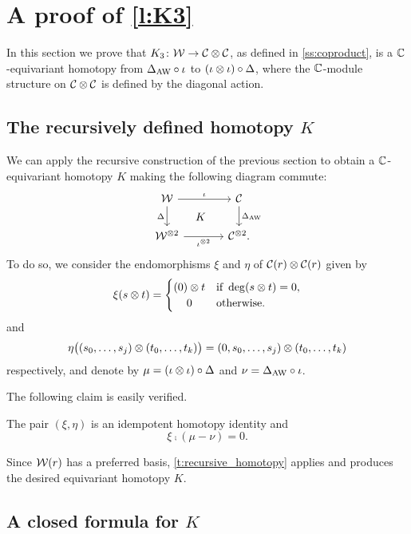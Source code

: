 
\section{A proof of \cref{l:K3}}\label{s:postponed}

In this section we prove that $K_3 \colon \mathcal{W} \to \mathcal{C} \otimes \mathcal{C}$, as defined in \cref{ss:coproduct}, is a $\mathbb{C}$-equivariant homotopy from $\Delta_{\operatorname{AW}} \mathbin{\circ} \iota$ to $(\iota \otimes \iota) \mathbin{\circ} \Delta$, where the $\mathbb{C}$-module structure on $\mathcal{C} \otimes \mathcal{C}$ is defined by the diagonal action.

\subsection{The recursively defined homotopy $K$}

We can apply the recursive construction of the previous section to obtain a $\mathbb{C}$-equivariant homotopy $K$ making the following diagram commute:
\begin{equation*}
	\begin{tikzcd}[column sep=large]
		\cW \arrow[r,"\iota"] \arrow[d,"\Delta"'] \arrow[dr,phantom,"K"]&
		\cC \arrow[d,"\Delta_{\AW}"] \\
		\cW^{\ot 2} \arrow[r,"\iota^{\ot 2}"'] &
		\cC^{\ot 2}.
	\end{tikzcd}
\end{equation*}
To do so, we consider the endomorphisms $\xi$ and $\eta$ of $\mathcal{C}(r) \otimes \mathcal{C}(r)$ given by
\[
\xi(s \ot t) =
\begin{cases}
	(0) \ot t & \text{if } \deg(s \ot t) = 0, \\
	\hfil0 & \text{otherwise}.
\end{cases}
\]
and
\[
\eta \big((s_0,\dots,s_j) \otimes (t_0,\dots,t_k)\big) = (0,s_0,\dots,s_j) \otimes (t_0,\dots,t_k)
\]
respectively, and denote by $\mu = (\iota \otimes \iota) \mathbin{\circ} \Delta$ and $\nu = \Delta_{\operatorname{AW}} \mathbin{\circ} \iota$.

The following claim is easily verified.
\begin{lemma}
	The pair $(\xi,\eta)$ is an idempotent homotopy identity and
	\[
	\xi \comp (\mu - \nu) = 0.
	\]
\end{lemma}
Since $\mathcal{W}(r)$ has a preferred basis, \cref{t:recursive_homotopy} applies and produces the desired equivariant homotopy $K$.

\subsection{A closed formula for $K$}\label{ss:closed formula for K}


